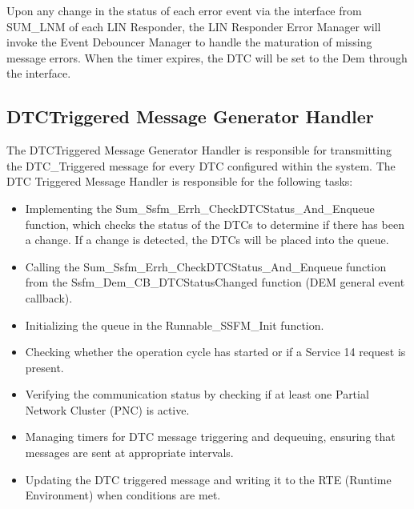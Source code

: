 Upon any change in the status of each error event via the interface  from SUM_LNM of each LIN Responder, the LIN Responder Error Manager will invoke the Event Debouncer Manager to handle the maturation of missing message errors. 
When the timer expires, the DTC will be set to the Dem through the  interface.

{  }

\subsection{DTCTriggered Message Generator Handler}
\label{subsec:DTCTriggerMessage}
The DTCTriggered Message Generator Handler is responsible for transmitting the DTC_Triggered message for every DTC configured
within the system.
The DTC Triggered Message Handler is responsible for the following tasks:
\begin{itemize}
    \item Implementing the Sum_Ssfm_Errh_CheckDTCStatus_And_Enqueue function, which checks the status of the DTCs to determine if there has been a change. If a change is detected, the DTCs will be placed into the queue.
    \item Calling the Sum_Ssfm_Errh_CheckDTCStatus_And_Enqueue function from the Ssfm_Dem_CB_DTCStatusChanged function (DEM general event callback).
    \item Initializing the queue in the Runnable_SSFM_Init function.
    \item Checking whether the operation cycle has started or if a Service 14 request is present.
    \item Verifying the communication status by checking if at least one Partial Network Cluster (PNC) is active.
    \item Managing timers for DTC message triggering and dequeuing, ensuring that messages are sent at appropriate intervals.
    \item Updating the DTC triggered message and writing it to the RTE (Runtime Environment) when conditions are met.
\end{itemize}

{              
}

